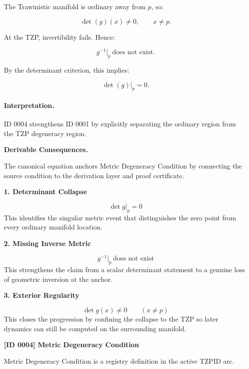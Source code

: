 The Trawinistic manifold is ordinary away from $p$, so:

\begin{equation}
\det(g)(x)\neq 0,
\qquad x\neq p .
\end{equation}

At the TZP, invertibility fails. Hence:

\begin{equation}
g^{-1}\big|_p \ \text{does not exist}.
\end{equation}

By the determinant criterion, this implies:

\begin{equation}
\det(g)\big|_p=0 .
\end{equation}

\paragraph{Interpretation.}
ID 0004 strengthens ID 0001 by explicitly separating the ordinary region from the TZP degeneracy region.

\par\vspace{0.35em}
\noindent\textbf{Derivable Consequences.}\quad
\begingroup
\footnotesize
\raggedright
The canonical equation anchors Metric Degeneracy Condition by connecting the source condition to the derivation layer and proof certificate.
\par\endgroup

\noindent\textbf{1. Determinant Collapse}\par
\[
\det g\vert_{p}=0
\]
\noindent This identifies the singular metric event that distinguishes the zero point from every ordinary manifold location.\par
\noindent\textbf{2. Missing Inverse Metric}\par
\[
g^{-1}\vert_{p}\ \text{does not exist}
\]
\noindent This strengthens the claim from a scalar determinant statement to a genuine loss of geometric inversion at the anchor.\par
\noindent\textbf{3. Exterior Regularity}\par
\[
\det g(x)\neq 0 \qquad (x\neq p)
\]
\noindent This closes the progression by confining the collapse to the TZP so later dynamics can still be computed on the surrounding manifold.\par

\clearpage
\noindent\textbf{[ID 0004] Metric Degeneracy Condition}\par
\vspace{0.35em}
\begingroup\small
{}
Metric Degeneracy Condition is a registry definition in the active TZPID arc.

